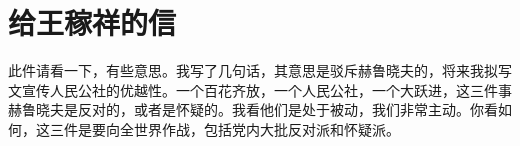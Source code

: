 \section[给王稼祥的信（一九五九年八月一日）]{给王稼祥的信}


此件请看一下，有些意思。我写了几句话，其意思是驳斥赫鲁晓夫的，将来我拟写文宣传人民公社的优越性。一个百花齐放，一个人民公社，一个大跃进，这三件事赫鲁晓夫是反对的，或者是怀疑的。我看他们是处于被动，我们非常主动。你看如何，这三件是要向全世界作战，包括党内大批反对派和怀疑派。


